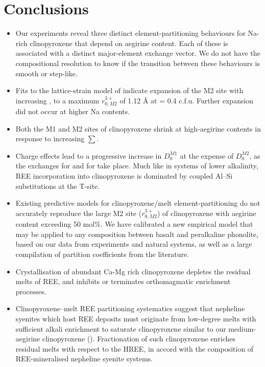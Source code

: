\documentclass[review,authoryear,12pt]{elsarticle}
\begin{document}
\section*{Conclusions}
\begin{itemize}
  \item Our experiments reveal three distinct element-partitioning behaviours for Na-rich clinopyroxene that depend on aegirine content. Each of these is associated with a distinct major-element exchange vector. We do not have the compositional resolution to know if the transition between these behaviours is smooth or step-like.
  
  \item Fits to the lattice-strain model of \citet{Blundy1994} indicate expansion of the M2 site with increasing , to a maximum $r_{0, M2}^{3+}$ of 1.12 \si{\angstrom}{}  at  = 0.4 c.f.u. Further expansion did not occur at higher Na contents.
  
  \item Both the M1 and M2 sites of clinopyroxene shrink at high-aegirine contents in response to increasing $\sum$.
  
  \item Charge effects lead to a progressive increase in $D_0^{M1}$ at the expense of $D_0^{M2}$, as the exchanges  for  and  for  take place. Much like in systems of lower alkalinity, REE incorporation into clinopyroxene is dominated by coupled Al--Si substitutions at the T-site.
  
  \item Existing predictive models for clinopyroxene/melt element-partitioning do not accurately reproduce the large M2 site ($r_{0,M2}^{3+}$) of clinopyroxene with aegirine content exceeding 50 mol\%. We have calibrated a new empirical model that may be applied to any composition between basalt and peralkaline phonolite, based on our data from experiments and natural systems, as well as a large compilation of partition coefficients from the literature.
  
  \item Crystallisation of abundant Ca-Mg rich clinopyroxene depletes the residual melts of REE, and inhibits or terminates orthomagmatic enrichment processes.

  \item Clinopyroxene--melt REE partitioning systematics suggest that nepheline syenites which host REE deposits must originate from low-degree melts with sufficient alkali enrichment to saturate clinopyroxene similar to our medium-aegirine clinopyroxene (). Fractionation of such clinopyroxene enriches residual melts with respect to the HREE, in accord with the composition of REE-mineralised nepheline syenite systems.
  
  \end{itemize}
\end{document}
